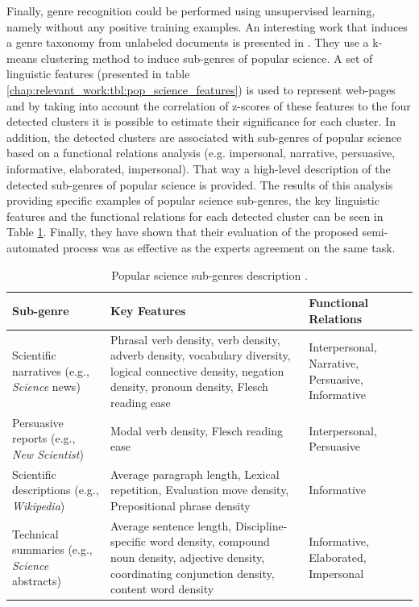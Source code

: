 Finally, genre recognition could be performed using unsupervised learning, namely without any positive training examples. An interesting work that induces a genre taxonomy from unlabeled documents is presented in \parencite{lieungnapar2017genre}. They use a k-means clustering method to induce sub-genres of popular science. A set of linguistic features (presented in table \ref{chap:relevant_work:tbl:pop_science_features}) is used to represent web-pages and by taking into account the correlation of z-scores of these features to the four detected clusters it is possible to estimate their significance for each cluster. In addition, the detected clusters are associated with sub-genres of popular science based on a functional relations analysis (e.g. impersonal, narrative, persuasive, informative, elaborated, impersonal). That way a high-level description of the detected sub-genres of popular science is provided. The results of this analysis providing specific examples of popular science sub-genres, the key linguistic features and the functional relations for each detected cluster can be seen in Table \ref{chap:relevant_work:tbl:pop_science_registers_features}. Finally, they have shown that their evaluation of the proposed semi-automated process was as effective as the experts agreement on the same task. 

\begin{table}[t]
	\center
	\caption {Popular science sub-genres description \parencite{lieungnapar2017genre}.}\label{chap:relevant_work:tbl:pop_science_registers_features}
	\begin{tabular}{p{3.5cm}p{7cm}p{2cm}}
		\hline
		Sub-genre & Key Features & Functional Relations \\
		\hline
		 Scientific narratives (e.g., \textit{Science} news) & Phrasal verb density, verb density, adverb density, vocabulary diversity, logical connective density, negation density, pronoun density, Flesch reading ease & Interpersonal, Narrative, Persuasive, Informative \\
         Persuasive reports (e.g., \textit{New Scientist}) & Modal verb density, Flesch reading ease & Interpersonal, Persuasive \\
         Scientific descriptions (e.g., \textit{Wikipedia}) & Average paragraph length, Lexical repetition, Evaluation move density, Prepositional phrase density & Informative\\
         Technical summaries (e.g., \textit{Science} abstracts)  & Average sentence length, Discipline-specific word density, compound noun density, adjective density, coordinating conjunction density, content word density & Informative, Elaborated, Impersonal  \\
  		\hline
	\end{tabular}
\end{table}

